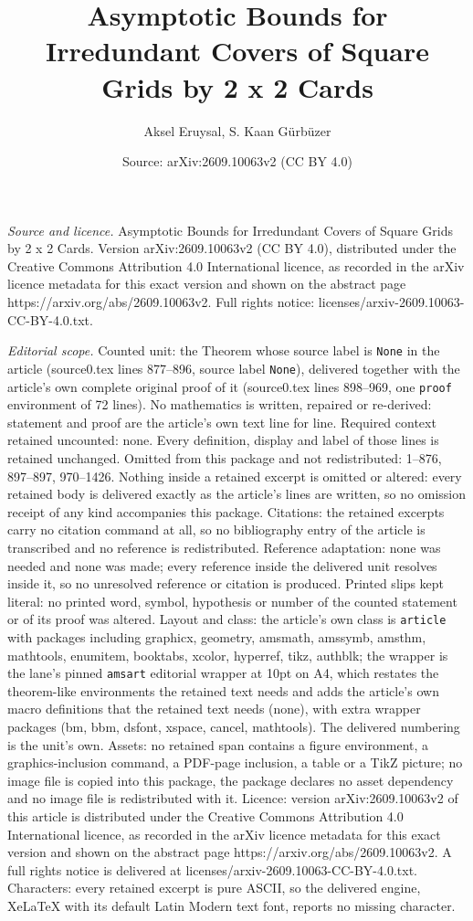 \documentclass[10pt,a4paper]{amsart}
\title[Asymptotic Bounds for Irredundant Covers of Square Grids by ]{Asymptotic Bounds for Irredundant Covers of Square Grids by 2 x 2 Cards}
\author{Aksel Eruysal, S. Kaan G\"urb\"uzer}
\date{Source: arXiv:2609.10063v2 (CC BY 4.0)}
\begin{document}
\maketitle

\noindent\emph{Source and licence.} Asymptotic Bounds for Irredundant Covers of Square Grids by 2 x 2 Cards. Version arXiv:2609.10063v2 (CC BY 4.0), distributed under the Creative Commons Attribution 4.0 International licence, as recorded in the arXiv licence metadata for this exact version and shown on the abstract page https://arxiv.org/abs/2609.10063v2. Full rights notice: licenses/arxiv-2609.10063-CC-BY-4.0.txt.\par\smallskip

\noindent\textit{Editorial scope.} Counted unit: the Theorem whose source label is \texttt{None} in the article (source0.tex lines 877--896, source label \texttt{None}), delivered together with the article's own complete original proof of it (source0.tex lines 898--969, one \texttt{proof} environment of 72 lines). No mathematics is written, repaired or re-derived: statement and proof are the article's own text line for line. Required context retained uncounted: none. Every definition, display and label of those lines is retained unchanged. Omitted from this package and not redistributed: 1--876, 897--897, 970--1426. Nothing inside a retained excerpt is omitted or altered: every retained body is delivered exactly as the article's lines are written, so no omission receipt of any kind accompanies this package. Citations: the retained excerpts carry no citation command at all, so no bibliography entry of the article is transcribed and no reference is redistributed. Reference adaptation: none was needed and none was made; every reference inside the delivered unit resolves inside it, so no unresolved reference or citation is produced. Printed slips kept literal: no printed word, symbol, hypothesis or number of the counted statement or of its proof was altered. Layout and class: the article's own class is \texttt{article} with packages including graphicx, geometry, amsmath, amssymb, amsthm, mathtools, enumitem, booktabs, xcolor, hyperref, tikz, authblk; the wrapper is the lane's pinned \texttt{amsart} editorial wrapper at 10pt on A4, which restates the theorem-like environments the retained text needs and adds the article's own macro definitions that the retained text needs (none), with extra wrapper packages (bm, bbm, dsfont, xspace, cancel, mathtools). The delivered numbering is the unit's own. Assets: no retained span contains a figure environment, a graphics-inclusion command, a PDF-page inclusion, a table or a TikZ picture; no image file is copied into this package, the package declares no asset dependency and no image file is redistributed with it. Licence: version arXiv:2609.10063v2 of this article is distributed under the Creative Commons Attribution 4.0 International licence, as recorded in the arXiv licence metadata for this exact version and shown on the abstract page https://arxiv.org/abs/2609.10063v2. A full rights notice is delivered at licenses/arxiv-2609.10063-CC-BY-4.0.txt. Characters: every retained excerpt is pure ASCII, so the delivered engine, XeLaTeX with its default Latin Modern text font, reports no missing character.
\end{document}
